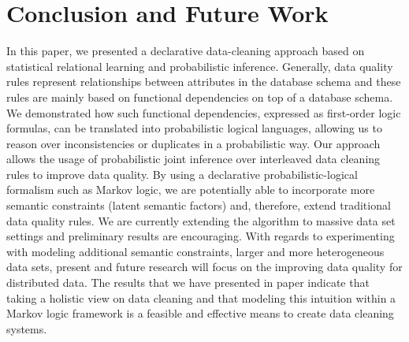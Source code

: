 
\section{Conclusion and Future Work}
\label{sec:conclusion}
In this paper, we presented a declarative data-cleaning approach based on statistical relational learning and probabilistic inference. Generally, data quality rules represent relationships between attributes in the database schema and these rules are mainly based on functional dependencies on top of a database schema. We demonstrated how such functional dependencies, expressed as first-order logic formulas, can be translated into probabilistic logical languages, allowing us to reason over inconsistencies or duplicates in a probabilistic way. Our approach allows the usage of probabilistic joint inference over interleaved data cleaning rules to improve data quality. By using a declarative probabilistic-logical formalism such as Markov logic, we are potentially able to incorporate more semantic constraints (latent semantic factors) and, therefore, extend traditional data quality rules. We are currently extending the algorithm to massive data set settings and preliminary results are encouraging. With regards to experimenting with modeling additional semantic constraints, larger and more heterogeneous data sets, present and future research will focus on the improving data quality for distributed data. The results that we have presented in paper indicate that taking a holistic view on data cleaning and that modeling this intuition within a Markov logic framework is a feasible and effective means to create data cleaning systems. 